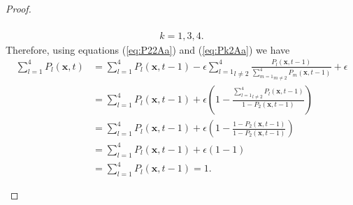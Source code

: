 \documentclass[\main/thesis.tex]{subfiles}
\begin{document}
\begin{proof}
\begin{itemize}
\begin{itemize}
\begin{itemize}
\begin{align*}
                                                      \tag{20}
                                                      \label{eq:Pk2Aa} \\
                                                      k {=} 1, 3, 4.
                                                    \end{align*}
                                                    Therefore, using equations (\ref{eq:P22Aa}) and (\ref{eq:Pk2Aa}) we have 
                                                    \begin{align*}
                                                      \sum_{l{=}1}^4 P_l(\boldsymbol{x}, t) 
                                                      &{=} \sum_{l{=}1}^4 P_l(\boldsymbol{x}, t{-}1)
                                                       {-} \epsilon \underset{l {\ne} 2}{\sum_{l{=}1}^4} 
                                                                      \frac{P_l(\boldsymbol{x}, t{-}1)}
                                                                           {\underset{m {\ne} 2}{\sum_{m{=}1}^4} 
                                                                           	P_m(\boldsymbol{x}, t{-}1)}
                                                       {+} \epsilon \\
                                                      &{=} \sum_{l{=}1}^4 P_l(\boldsymbol{x}, t{-}1)
                                                       {+} \epsilon \left (1 {-} \frac{\underset{l {\ne} 2}{\sum_{l{=}1}^4} 
                                                                                 P_l(\boldsymbol{x}, t{-}1)}
                                                                                {1 {-} P_2(\boldsymbol{x}, t{-}1)} \right) \\
                                                      &{=} \sum_{l{=}1}^4 P_l(\boldsymbol{x}, t{-}1)
                                                       {+} \epsilon \left (1 {-} \frac{1 {-} P_2(\boldsymbol{x}, t{-}1)}
                                                                                {1 {-} P_2(\boldsymbol{x}, t{-}1)} \right) \\
                                                      &{=} \sum_{l{=}1}^4 P_l(\boldsymbol{x}, t{-}1)
                                                       {+} \epsilon (1 {-} 1) \\
                                                      &{=} \sum_{l{=}1}^4 P_l(\boldsymbol{x}, t{-}1) {=} 1.
                                                    \end{align*}

\end{itemize}
\end{itemize}
\end{itemize}
\end{proof}
\end{document}
